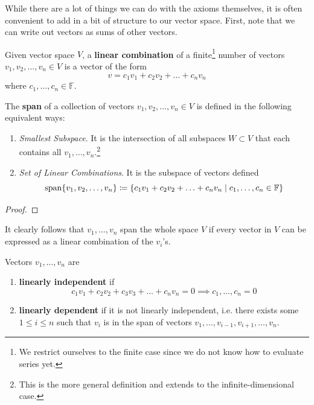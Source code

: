   While there are a lot of things we can do with the axioms themselves, it is often convenient to add in a bit of structure to our vector space. First, note that we can write out vectors as sums of other vectors. 

  \begin{definition}
    Given vector space $V$, a \textbf{linear combination} of a finite\footnote{We restrict ourselves to the finite case since we do not know how to evaluate series yet.} number of vectors $v_1, v_2, \ldots, v_n \in V$ is a vector of the form 
    \begin{equation}
      v = c_1 v_1 + c_2 v_2 + \ldots + c_n v_n
    \end{equation}
    where $c_1, \ldots, c_n \in \mathbb{F}$. 
  \end{definition}

  \begin{definition}[Span]
    The \textbf{span} of a collection of vectors $v_1, v_2, \ldots, v_n \in V$ is defined in the following equivalent ways: 
    \begin{enumerate}
      \item \textit{Smallest Subspace}. It is the intersection of all subspaces $W \subset V$ that each contains all $v_1, \ldots, v_n$.\footnote{This is the more general definition and extends to the infinite-dimensional case.}
      \item \textit{Set of Linear Combinations}. It is the subspace of vectors defined 
        \begin{equation}
          \operatorname{span} \{ v_1, v_2, \ldots, v_n \} \coloneqq \{ c_1 v_1 + c_2 v_2 + \ldots + c_n v_n \mid  c_1, \ldots, c_n \in \mathbb{F}\}
        \end{equation}
    \end{enumerate}
  \end{definition}
  \begin{proof}
    
  \end{proof}

  It clearly follows that $v_1, \ldots, v_n$ span the whole space $V$ if every vector in $V$ can be expressed as a linear combination of the $v_i$'s. 

  \begin{definition}
    Vectors $v_1, \ldots, v_n$ are 
    \begin{enumerate}
      \item \textbf{linearly independent} if 
        \begin{equation}
          c_1 v_1 + c_2 v_2 + c_3 v_3 + \ldots + c_n v_n = 0 \implies c_1, \ldots, c_n = 0
        \end{equation}
      \item \textbf{linearly dependent} if it is not linearly independent, i.e. there exists some $1 \leq i \leq n$ such that $v_i$ is in the span of vectors $v_1, \ldots, v_{i-1}, v_{i+1}, \ldots, v_n$. 
    \end{enumerate}
  \end{definition}


